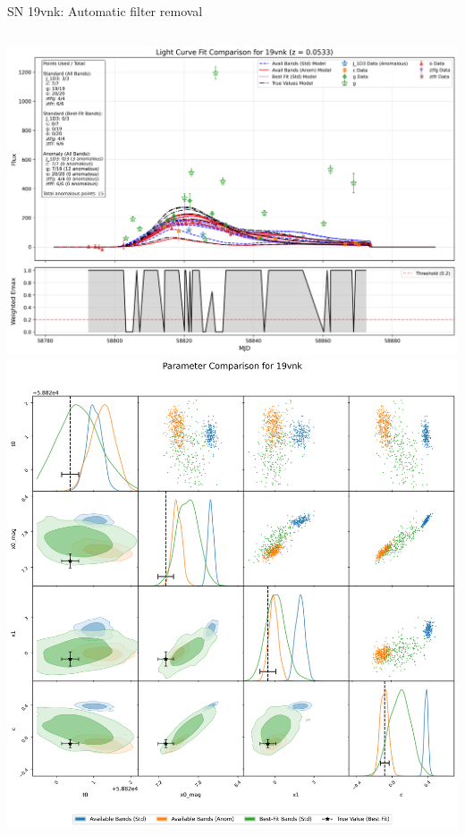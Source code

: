 \documentclass[aspectratio=169]{beamer}
\begin{document}
\begin{frame}{SN 19vnk: Automatic filter removal}
  \begin{columns}
    \includegraphics[width=\textwidth]{images/light_curve_comparison_19vnk.png}
    \includegraphics[width=\textwidth]{images/corner_comparison_19vnk.png}
  \end{columns}
\end{frame}
\end{document}
